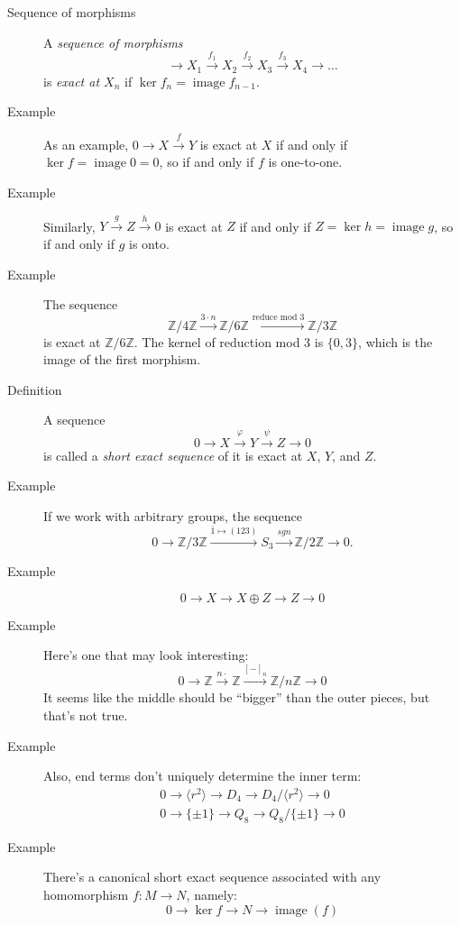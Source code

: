 \documentclass[12pt]{article}
\newcommand{\bbZ}{\mathbb{Z}}
\newcommand{\image}{\operatorname{image}}
\begin{document}
\begin{description}
\item[Sequence of morphisms] A \emph{sequence of morphisms}
  \[\rightarrow X_1\xrightarrow{f_1} X_2 \xrightarrow{f_2} X_3
    \xrightarrow{f_3} X_4\rightarrow \dotsc\] is \emph{exact at $X_n$}
    if $\ker f_n=\image f_{n-1}$. 
  \item[Example] As an example, $0\rightarrow X \xrightarrow{f} Y$ is
    exact at $X$ if and only if $\ker f=\image 0=0$, so if and only if
    $f$ is one-to-one. 
  \item[Example] Similarly, $Y\xrightarrow{g} Z \xrightarrow{h} 0$ is
    exact at $Z$ if and only if $Z=\ker h = \image g$, so if and only
    if $g$ is onto. 
  \item[Example] The sequence \[\bbZ/4\bbZ \xrightarrow{3\cdot n}
      \bbZ/6\bbZ \xrightarrow{\textrm{reduce mod 3}} \bbZ/3\bbZ\] is
    exact at $\bbZ/6\bbZ$. The kernel of reduction mod 3 is $\{0,3\}$,
    which is the image of the first morphism. 
  \item[Definition] A sequence \[0 \rightarrow X \xrightarrow{\varphi}
      Y \xrightarrow{\psi} Z \rightarrow 0\] is called a \emph{short
      exact sequence} of it is exact at $X$, $Y$, and $Z$. 
  \item[Example] If we work with arbitrary groups, the sequence \[0
      \rightarrow \bbZ/3\bbZ \xrightarrow{\overline{1}\mapsto (123)}
      S_3 \xrightarrow{sgn} \bbZ/2\bbZ \rightarrow 0.\]
  \item[Example] \[0 \rightarrow X \rightarrow X\oplus Z \rightarrow
      Z\rightarrow 0\]
  \item[Example] Here's one that may look interesting: 
\[0 \rightarrow \bbZ \xrightarrow{n\cdot } \bbZ \xrightarrow{[-]_n}
  \bbZ/n\bbZ \rightarrow 0\] It seems like the middle should be
``bigger'' than the outer pieces, but that's not true. 
\item[Example] Also, end terms don't uniquely determine the inner
  term: 
  \begin{align*}
    0 \rightarrow \langle r^2 \rangle \rightarrow D_4 \rightarrow
    D_4/\langle r^2\rangle \rightarrow 0 \\
 0 \rightarrow \{\pm 1\} \rightarrow Q_8 \rightarrow
    Q_8/ \{\pm 1\} \rightarrow 0 
  \end{align*}
\item[Example] There's a canonical short exact sequence associated
  with any homomorphism $f: M\rightarrow N$, namely: \[0 \rightarrow
    \ker f \rightarrow N \rightarrow \operatorname{image}(f)
\]
\end{description}
\end{document}
